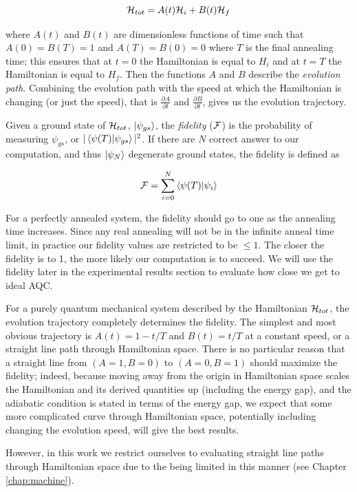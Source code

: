 \begin{equation}
	\mathcal{H}_{tot} = A(t)\mathcal{H}_i + B(t)\mathcal{H}_f
\end{equation}

where $A(t)$ and $B(t)$ are dimensionless functions of time such that $A(0) = B(T) = 1$ and $A(T) = B(0) = 0$ where $T$ is the final annealing time; this ensures that at $t = 0$ the Hamiltonian is equal to $H_i$ and at $t = T$ the Hamiltonian is equal to $H_f$.  Then the functions $A$ and $B$ describe the \emph{evolution path}.  Combining the evolution path with the speed at which the Hamiltonian is changing (or just the speed), that is $\frac{\partial A}{\partial t}$ and $\frac{\partial B}{\partial t}$, gives us the evolution trajectory.  

Given a ground state of $\mathcal{H}_{tot}$, $\mathinner{|{\psi_{gs}}\rangle}$, the \emph{fidelity} ($\mathcal{F}$) is the probability of measuring $\psi_{gs}$, or $|\mathinner{\langle{\psi(T)|\psi_{gs}}\rangle}|^2$.  If there are $N$ correct answer to our computation, and thus $\mathinner{|{\psi_N}\rangle}$ degenerate ground states, the fidelity is defined as

\begin{equation}
	\mathcal{F} = \sum_{i=0}^N \mathinner{\langle{\psi(T)|\psi_i}\rangle}
\end{equation}

For a perfectly annealed system, the fidelity should go to one as the annealing time increases.  Since any real annealing will not be in the infinite anneal time limit, in practice our fidelity values are restricted to be $\leq 1$.  The closer the fidelity is to 1, the more likely our computation is to succeed.  We will use the fidelity later in the experimental results section to evaluate how close we get to ideal AQC.

For a purely quantum mechanical system described by the Hamiltonian $\mathcal{H}_{tot}$, the evolution trajectory completely determines the fidelity.
The simplest and most obvious trajectory is $A(t) = 1 - t/T$ and $B(t) = t/T$ at a constant speed, or a straight line path through Hamiltonian space.
There is no particular reason that a straight line from $(A=1,B=0)$ to $(A=0,B=1)$ should maximize the fidelity; indeed, because moving away from the origin in Hamiltonian space scales the Hamiltonian and its derived quantities up (including the energy gap), and the adiabatic condition is stated in terms of the energy gap, we expect that some more complicated curve through Hamiltonian space, potentially including changing the evolution speed, will give the best results.

However, in this work we restrict ourselves to evaluating straight line paths through Hamiltonian space due to the \machine being limited in this manner (see Chapter \ref{chap:machine}).

